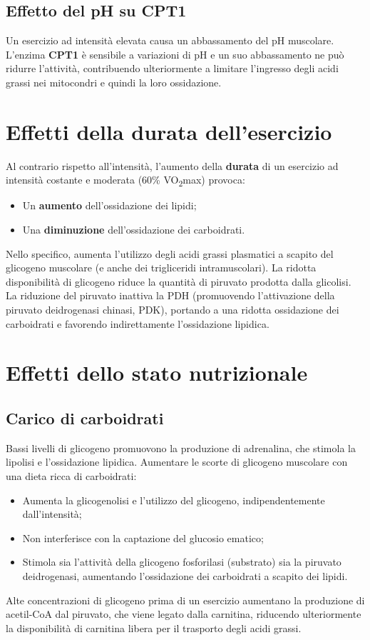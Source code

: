 \documentclass[12pt,a4paper]{report}
\begin{document}
\subsection{Effetto del pH su CPT1}
Un esercizio ad intensità elevata causa un abbassamento del pH muscolare. L'enzima \textbf{CPT1} è sensibile a variazioni di pH e un suo abbassamento ne può ridurre l'attività, contribuendo ulteriormente a limitare l'ingresso degli acidi grassi nei mitocondri e quindi la loro ossidazione.

\section{Effetti della durata dell'esercizio}
Al contrario rispetto all'intensità, l'aumento della \textbf{durata} di un esercizio ad intensità costante e moderata (60\% VO\textsubscript{2}max) provoca:
\begin{itemize}
\item Un \textbf{aumento} dell'ossidazione dei lipidi;
\item Una \textbf{diminuzione} dell'ossidazione dei carboidrati.
\end{itemize}
Nello specifico, aumenta l'utilizzo degli acidi grassi plasmatici a scapito del glicogeno muscolare (e anche dei trigliceridi intramuscolari).
La ridotta disponibilità di glicogeno riduce la quantità di piruvato prodotta dalla glicolisi. La riduzione del piruvato inattiva la PDH (promuovendo l'attivazione della piruvato deidrogenasi chinasi, PDK), portando a una ridotta ossidazione dei carboidrati e favorendo indirettamente l'ossidazione lipidica.

\section{Effetti dello stato nutrizionale}
\subsection{Carico di carboidrati}
Bassi livelli di glicogeno promuovono la produzione di adrenalina, che stimola la lipolisi e l'ossidazione lipidica.
Aumentare le scorte di glicogeno muscolare con una dieta ricca di carboidrati:
\begin{itemize}
\item Aumenta la glicogenolisi e l'utilizzo del glicogeno, indipendentemente dall'intensità;
\item Non interferisce con la captazione del glucosio ematico;
\item Stimola sia l'attività della glicogeno fosforilasi (substrato) sia la piruvato deidrogenasi, aumentando l'ossidazione dei carboidrati a scapito dei lipidi.
\end{itemize}
Alte concentrazioni di glicogeno prima di un esercizio aumentano la produzione di acetil-CoA dal piruvato, che viene legato dalla carnitina, riducendo ulteriormente la disponibilità di carnitina libera per il trasporto degli acidi grassi.
\end{document}
